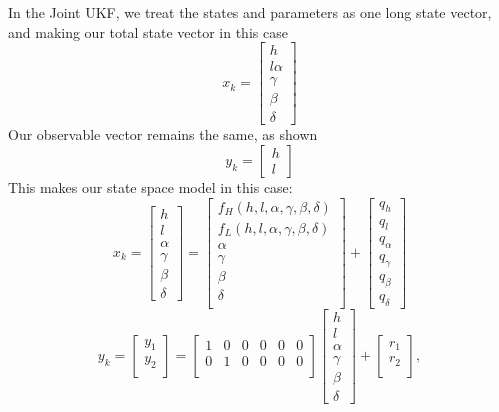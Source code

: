 In the Joint UKF, we treat the states and parameters as one long state vector, and making our total state vector in this case
\begin{equation}
x_k = 
\begin{bmatrix}
h\\
l
\alpha\\
\gamma\\
\beta\\
\delta
\end{bmatrix}
\end{equation}
Our observable vector remains the same, as shown
\begin{equation}
y_k =
\begin{bmatrix}
h\\
l
\end{bmatrix}
\end{equation}
This makes our state space model in this case:
\begin{equation}
x_k = \begin{bmatrix}
h\\
l\\
\alpha\\
\gamma\\
\beta\\
\delta
\end{bmatrix} = \begin{bmatrix}
f_H(h,l,\alpha, \gamma, \beta, \delta)\\
f_L(h,l,\alpha, \gamma, \beta, \delta)\\
\alpha\\
\gamma\\
\beta\\
\delta\\
\end{bmatrix} + \begin{bmatrix}
q_h\\
q_l\\
q_{\alpha}\\
q_{\gamma}\\
q_{\beta}\\
q_{\delta}
\end{bmatrix}
\end{equation}
\begin{equation}
y_k = \begin{bmatrix}
y_1\\
y_2\\
\end{bmatrix} = 
\begin{bmatrix}
1 & 0 & 0 & 0 & 0 & 0\\
0 & 1 & 0 & 0 & 0 & 0\\
\end{bmatrix}
\begin{bmatrix}
h\\
l\\
\alpha\\
\gamma\\
\beta\\
\delta
\end{bmatrix}+
\begin{bmatrix}
r_1\\
r_2\\
\end{bmatrix},
\end{equation}
